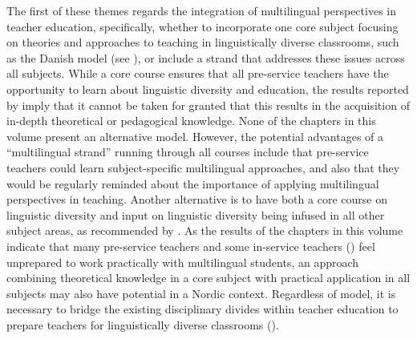 \documentclass[output=paper]{langscibook}
\begin{document}
The first of these themes regards the integration of multilingual perspectives in teacher education, specifically, whether to incorporate one core subject focusing on theories and approaches to teaching in linguistically diverse classrooms, such as the Danish model (see \citealt{chapters/5_ostergaard}), or include a strand that addresses these issues across all subjects. While a core course ensures that all pre-service teachers have the opportunity to learn about linguistic diversity and education, the results reported by \textcite{chapters/5_ostergaard} imply that it cannot be taken for granted that this results in the acquisition of in-depth theoretical or pedagogical knowledge. None of the chapters in this volume present an alternative model. However, the potential advantages of a “multilingual strand” running through all courses include that pre-service teachers could learn subject-specific multilingual approaches, and also that they would be regularly reminded about the importance of applying multilingual perspectives in teaching. Another alternative is to have both a core course on linguistic diversity and input on linguistic diversity being infused in all other subject areas, as recommended by \citet{Foley2022}. As the results of the chapters in this volume indicate that many pre-service teachers \parencite{chapters/7_alisaari, chapters/8_heikkola, chapters/6_iversen} and some in-service teachers (\citealt{chapters/2_Gunnthorsdottira}) feel unprepared to work practically with multilingual students, an approach combining theoretical knowledge in a core subject with practical application in all subjects may also have potential in a Nordic context. Regardless of model, it is necessary to bridge the existing disciplinary divides within teacher education to prepare teachers for linguistically diverse classrooms (\citealt{Bale2024,BurtonEtAl2024}).
\end{document}
